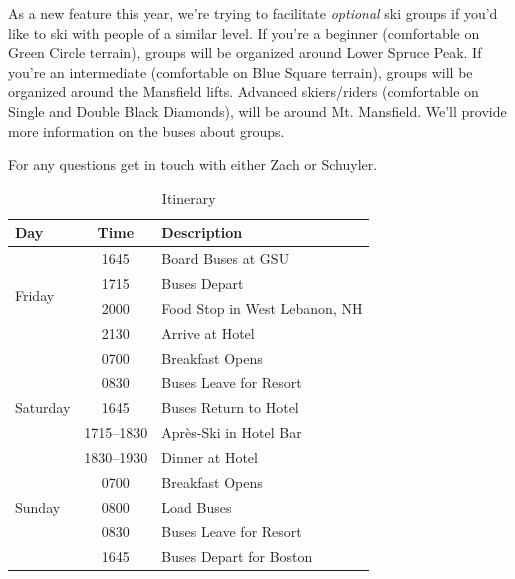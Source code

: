 As a new feature this year, we're trying to facilitate \emph{optional} ski groups if you'd like to ski with people of a similar level.
If you're a beginner (comfortable on Green Circle terrain), groups will be organized around Lower Spruce Peak.
If you're an intermediate (comfortable on Blue Square terrain), groups will be organized around the Mansfield lifts.
Advanced skiers/riders (comfortable on Single and Double Black Diamonds), will be around Mt. Mansfield.
We'll provide more information on the buses about groups.

For any questions get in touch with either Zach or Schuyler.

\begin{table}[h]
  \vspace{-0.2in}
  \def\taw{0.14}
  \small
  \centering
  \caption{Itinerary}
  \label{tab-itinerary}
  \begin{tabular}{lcl}
    \toprule
    Day & Time & Description\\
    \midrule
    \multirow{4}{*}{
      \begin{minipage}{\taw\columnwidth}
        Friday
      \end{minipage}}
    & 1645 & Board Buses at GSU\\
    & 1715 & Buses Depart\\
    & 2000 & Food Stop in West Lebanon, NH \\
    & 2130 & Arrive at Hotel \\
    \midrule \multirow{5}{*}{
      \begin{minipage}{\taw\columnwidth}
        Saturday
    \end{minipage}}
    & 0700 & Breakfast Opens\\
    & 0830 & Buses Leave for Resort \\
    & 1645 & Buses Return to Hotel \\
    & 1715--1830 & Apr\`es-Ski in Hotel Bar\\
    & 1830--1930 & Dinner at Hotel \\
    \midrule \multirow{3}{*}{
      \begin{minipage}{\taw\columnwidth}
        Sunday
    \end{minipage}}
    & 0700 & Breakfast Opens\\
    & 0800 & Load Buses\\
    & 0830 & Buses Leave for Resort \\
    & 1645 & Buses Depart for Boston \\
    \bottomrule
  \end{tabular}
\end{table}


